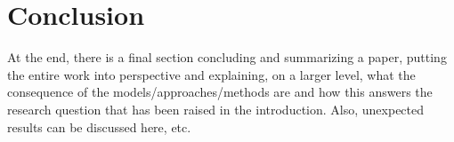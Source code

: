 \documentclass[12pt,twoside]{article}
\theoremstyle{plain}
\theoremstyle{definition}
\theoremstyle{remark}
\begin{document}
\section{Conclusion}
\label{sec:concl}

At the end, there is a final section concluding and summarizing a paper, putting the entire work into perspective and explaining, on a larger level, what the consequence of the models/approaches/methods are and how this answers the research question that has been raised in the introduction. Also, unexpected results can be discussed here, etc.

%
%
\newpage


\end{document}
